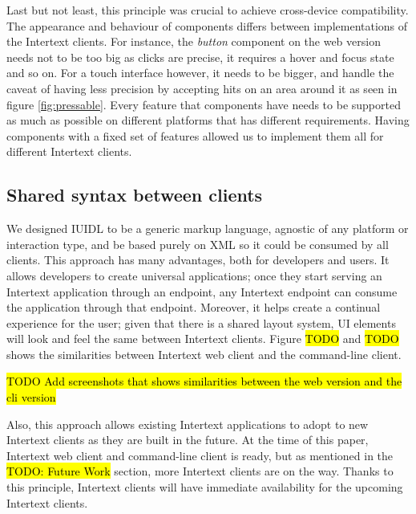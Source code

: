 Last but not least, this principle was crucial to achieve cross-device compatibility. The appearance and behaviour of components differs between implementations of the Intertext clients. For instance, the \textit{button} component on the web version needs not to be too big as clicks are precise, it requires a hover and focus state and so on. For a touch interface however, it needs to be bigger, and handle the caveat of having less precision by accepting hits on an area around it as seen in figure \ref{fig:pressable}. Every feature that components have needs to be supported as much as possible on different platforms that has different requirements. Having components with a fixed set of features allowed us to implement them all for different Intertext clients.

\subsection{Shared syntax between clients}

We designed IUIDL to be a generic markup language, agnostic of any platform or interaction type, and be based purely on XML so it could be consumed by all clients. This approach has many advantages, both for developers and users. It allows developers to create universal applications; once they start serving an Intertext application through an endpoint, any Intertext endpoint can consume the application through that endpoint. Moreover, it helps create a continual experience for the user; given that there is a shared layout system, UI elements will look and feel the same between Intertext clients. Figure \hl{TODO} and \hl{TODO} shows the similarities between Intertext web client and the command-line client.

\hl{TODO Add screenshots that shows similarities between the web version and the cli version}

Also, this approach allows existing Intertext applications to adopt to new Intertext clients as they are built in the future. At the time of this paper, Intertext web client and command-line client is ready, but as mentioned in the \hl{TODO: Future Work} section, more Intertext clients are on the way. Thanks to this principle, Intertext clients will have immediate availability for the upcoming Intertext clients.
